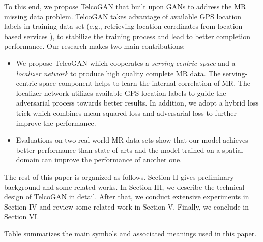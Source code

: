 To this end, we propose TelcoGAN that built upon GANs to address the MR missing data problem. TelcoGAN takes advantage of available GPS location labels in training data set (e.g., retrieving location corrdinates from location-based services \cite{DBLP:journals/imwut/HuangLWCXZ17}), to stabilize the training process and lead to better completion performance. Our research makes two main contributions:

\begin{itemize}
  \item We propose TelcoGAN which cooperates a \emph{serving-centric space} and a \emph{localizer network} to produce high quality complete MR data. The serving-centric space component helps to learn the internal correlation of MR. The localizer network utilizes available GPS location labels to guide the adversarial process towards better results. In addition, we adopt a hybrid loss trick which combines mean squared loss and adversarial loss to further improve the performance.
  \item Evaluations on two real-world MR data sets show that our model achieves better performance than state-of-arts and the model trained on a spatial domain can improve the performance of another one.
\end{itemize}

The rest of this paper is organized as follows. Section II gives preliminary background and some related works. In Section III, we describe the technical design of TelcoGAN in detail. After that, we conduct extensive experiments in Section IV and review some related work in Section V. Finally, we conclude in Section VI.

Table  summarizes the main symbols and associated meanings used in this paper. 